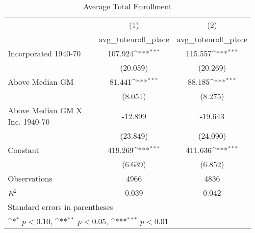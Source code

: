 \begin{table}[htbp]\centering
\def\sym#1{\ifmmode^{#1}\else\(^{#1}\)\fi}
\caption{Average Total Enrollment}
\begin{tabular}{l*{2}{c}}
\hline\hline
                    &\multicolumn{1}{c}{(1)}&\multicolumn{1}{c}{(2)}\\
                    &\multicolumn{1}{c}{avg\_totenroll\_place}&\multicolumn{1}{c}{avg\_totenroll\_place}\\
\hline
Incorporated 1940-70&     107.924\sym{***}&     115.557\sym{***}\\
                    &    (20.059)         &    (20.269)         \\
[1em]
Above Median GM     &      81.441\sym{***}&      88.185\sym{***}\\
                    &     (8.051)         &     (8.275)         \\
[1em]
Above Median GM X Inc. 1940-70&     -12.899         &     -19.643         \\
                    &    (23.849)         &    (24.090)         \\
[1em]
Constant            &     419.269\sym{***}&     411.636\sym{***}\\
                    &     (6.639)         &     (6.852)         \\
\hline
Observations        &        4966         &        4836         \\
\(R^{2}\)           &       0.039         &       0.042         \\
\hline\hline
\multicolumn{3}{l}{\footnotesize Standard errors in parentheses}\\
\multicolumn{3}{l}{\footnotesize \sym{*} \(p<0.10\), \sym{**} \(p<0.05\), \sym{***} \(p<0.01\)}\\
\end{tabular}
\end{table}
